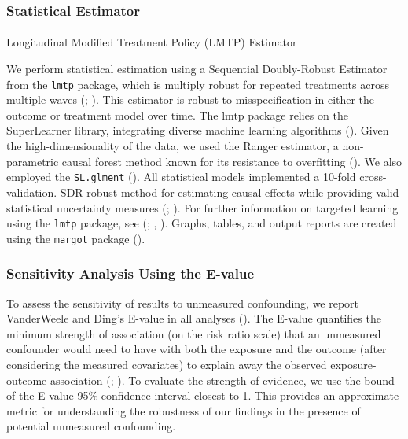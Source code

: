 \documentclass[
  single column]{article}
\makeatletter
\let\oldparagraph\paragraph
\renewcommand{\paragraph}{
    \@ifstar
      \xxxParagraphStar
      \xxxParagraphNoStar
  }
\newcommand{\xxxParagraphStar}[1]{\oldparagraph*{#1}\mbox{}}
\newcommand{\xxxParagraphNoStar}[1]{\oldparagraph{#1}\mbox{}}
\makeatother
\begin{document}
\subsubsection{Statistical Estimator}\label{statistical-estimator}

\paragraph{Longitudinal Modified Treatment Policy (LMTP)
Estimator}\label{longitudinal-modified-treatment-policy-lmtp-estimator}

We perform statistical estimation using a Sequential Doubly-Robust
Estimator from the \texttt{lmtp} package, which is multiply robust for
repeated treatments across multiple waves
(;
). This estimator
is robust to misspecification in either the outcome or treatment model
over time. The lmtp package relies on the SuperLearner library,
integrating diverse machine learning algorithms
(). Given the
high-dimensionality of the data, we used the Ranger estimator, a
non-parametric causal forest method known for its resistance to
overfitting (). We
also employed the \texttt{SL.glment}
(). All
statistical models implemented a 10-fold cross-validation. SDR robust
method for estimating causal effects while providing valid statistical
uncertainty measures (; ). For further
information on targeted learning using the \texttt{lmtp} package, see
(;
,
). Graphs, tables, and output reports
are created using the \texttt{margot} package
().

\subsubsection{Sensitivity Analysis Using the
E-value}\label{sensitivity-analysis-using-the-e-value}

To assess the sensitivity of results to unmeasured confounding, we
report VanderWeele and Ding's E-value in all analyses
(). The E-value
quantifies the minimum strength of association (on the risk ratio scale)
that an unmeasured confounder would need to have with both the exposure
and the outcome (after considering the measured covariates) to explain
away the observed exposure-outcome association
(;
). To
evaluate the strength of evidence, we use the bound of the E-value 95\%
confidence interval closest to 1. This provides an approximate metric
for understanding the robustness of our findings in the presence of
potential unmeasured confounding.
\end{document}
